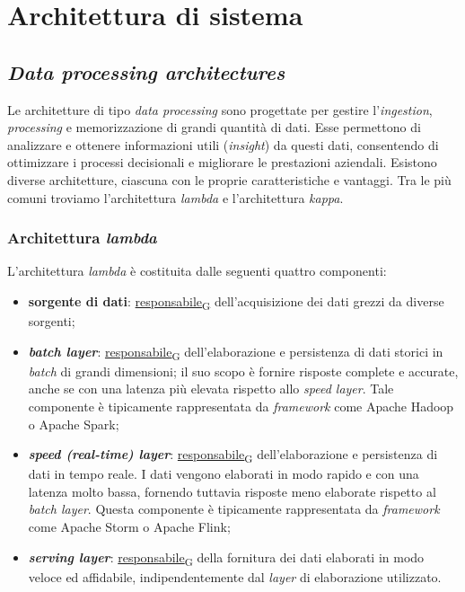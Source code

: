 \section{Architettura di sistema}

\subsection{\textit{Data processing architectures}}
Le architetture di tipo \textit{data processing} sono progettate per gestire l'\textit{ingestion}, \textit{processing} e memorizzazione di grandi quantità di dati.
Esse permettono di analizzare e ottenere informazioni utili (\textit{insight}) da questi dati, consentendo di ottimizzare i processi decisionali e migliorare le prestazioni aziendali.
Esistono diverse architetture, ciascuna con le proprie caratteristiche e vantaggi. Tra le più comuni troviamo l'architettura \textit{lambda} e l'architettura \textit{kappa}.

\subsubsection{Architettura \textit{lambda}}
L'architettura \textit{lambda} è costituita dalle seguenti quattro componenti:
\begin{itemize}
	\item \textbf{sorgente di dati}: \href{https://7last.github.io/docs/pb/documentazione-interna/glossario\#responsabile}{responsabile\textsubscript{G}} dell'acquisizione dei dati grezzi da diverse sorgenti;
	\item \textbf{\textit{batch layer}}: \href{https://7last.github.io/docs/pb/documentazione-interna/glossario\#responsabile}{responsabile\textsubscript{G}} dell'elaborazione e persistenza di dati storici in \textit{batch} di grandi dimensioni; il suo scopo è fornire risposte complete e accurate, anche se con una latenza più elevata rispetto allo \textit{speed layer}. Tale componente è tipicamente rappresentata da \textit{framework} come Apache Hadoop o Apache Spark;
	\item \textbf{\textit{speed (real-time) layer}}: \href{https://7last.github.io/docs/pb/documentazione-interna/glossario\#responsabile}{responsabile\textsubscript{G}} dell'elaborazione e persistenza di dati in tempo reale. I dati vengono elaborati in modo rapido e con una latenza molto bassa, fornendo tuttavia risposte meno elaborate rispetto al \textit{batch layer}. Questa componente è tipicamente rappresentata da \textit{framework} come Apache Storm o Apache Flink;
	\item \textbf{\textit{serving layer}}: \href{https://7last.github.io/docs/pb/documentazione-interna/glossario\#responsabile}{responsabile\textsubscript{G}} della fornitura dei dati elaborati in modo veloce ed affidabile, indipendentemente dal \textit{layer} di elaborazione utilizzato.
\end{itemize}

